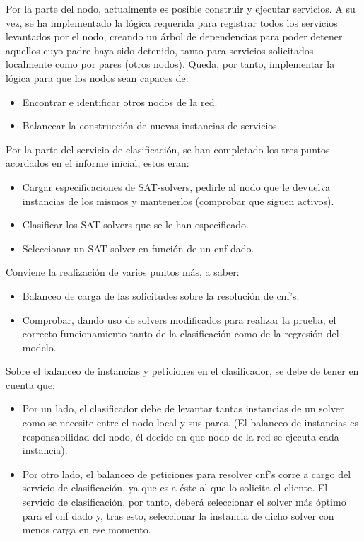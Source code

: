 \documentclass[11pt]{article}
\begin{document}
		Por la parte del nodo, actualmente es posible construir y ejecutar servicios. A su vez, se ha implementado la lógica requerida para registrar
		todos los servicios levantados por el nodo, creando un árbol de dependencias para poder detener aquellos cuyo padre haya sido detenido, tanto para 
		servicios solicitados localmente como por pares (otros nodos).
		Queda, por tanto, implementar la lógica para que los nodos sean capaces de:
		\begin{itemize}
			\item Encontrar e identificar otros nodos de la red.
			\item Balancear la construcción de nuevas instancias de servicios. \\
		\end{itemize}

		Por la parte del servicio de clasificación, se han completado los tres puntos acordados en el informe inicial, estos eran:
		\begin{itemize}
			\item Cargar especificaciones de SAT-solvers, pedirle al nodo que le devuelva
			 instancias de los mismos y mantenerlos (comprobar que siguen activos).
			\item Clasificar los SAT-solvers que se le han especificado.
			\item Seleccionar un SAT-solver en función de un cnf dado.
		\end{itemize}
		Conviene la realización de varios puntos más, a saber:
		\begin{itemize}
			\item Balanceo de carga de las solicitudes sobre la resolución de cnf's.
			\item Comprobar, dando uso de solvers modificados para realizar la prueba, el correcto funcionamiento tanto de la clasificación como de la regresión del modelo. \leavevmode \\
		\end{itemize}

		Sobre el balanceo de instancias y peticiones en el clasificador, se debe de tener en cuenta que:
		\begin{itemize}
			\item Por un lado, el clasificador debe de levantar tantas instancias de un solver como se necesite entre el nodo local y sus pares.
				(El balanceo de instancias es
				responsabilidad del nodo, él decide en que nodo de la red se ejecuta cada instancia).
			\item Por otro lado, el balanceo de peticiones para resolver cnf's corre a cargo del servicio de clasificación, ya que es a éste al que lo solicita 
				el cliente.
				El servicio de clasificación, por tanto, deberá seleccionar el solver más óptimo para el cnf dado y, tras esto, seleccionar la instancia de dicho
				solver con menos carga en ese momento.
		\end{itemize}
\end{document}
